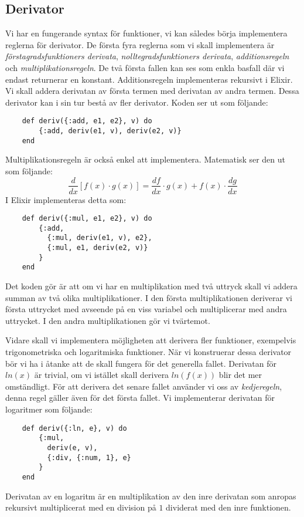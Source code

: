 \documentclass[a4paper,11pt]{article}
\begin{document}
\subsection*{Derivator}
Vi har en fungerande syntax för funktioner, vi kan således börja implementera reglerna för derivator. De första fyra reglerna som vi skall implementera är \textit{förstagradsfunktioners derivata}, \textit{nolltegradsfunktioners derivata}, \textit{additionsregeln} och \textit{multiplikationsregeln}. De två första fallen kan ses som enkla basfall där vi endast returnerar en konstant. Additionsregeln implementeras rekursivt i Elixir. Vi skall addera derivatan av första termen med derivatan av andra termen. Dessa derivator kan i sin tur bestå av fler derivator. Koden ser ut som följande:
\begin{verbatim}
    def deriv({:add, e1, e2}, v) do
        {:add, deriv(e1, v), deriv(e2, v)}
    end
\end{verbatim}
Multiplikationsregeln är också enkel att implementera. Matematisk ser den ut som följande:
$$\frac{d}{dx} [f(x) \cdot g(x)] = \frac{df}{dx} \cdot g(x) + f(x) \cdot \frac{dg}{dx}$$
I Elixir implementeras detta som:
\begin{verbatim}
    def deriv({:mul, e1, e2}, v) do
        {:add,
          {:mul, deriv(e1, v), e2},
          {:mul, e1, deriv(e2, v)}
        }
    end
\end{verbatim}
Det koden gör är att om vi har en multiplikation med två uttryck skall vi addera summan av två olika multiplikationer. I den första multiplikationen deriverar vi första uttrycket med avseende på en viss variabel och multiplicerar med andra uttrycket. I den andra multiplikationen gör vi tvärtemot. 

Vidare skall vi implementera möjligheten att derivera fler funktioner, exempelvis trigonometriska och logaritmiska funktioner. När vi konstruerar dessa derivator bör vi ha i åtanke att de skall fungera för det generella fallet. Derivatan för \(ln(x)\) är trivial, om vi istället skall derivera \(ln(f(x))\) blir det mer omständligt. För att derivera det senare fallet använder vi oss av \textit{kedjeregeln}, denna regel gäller även för det första fallet. Vi implementerar derivatan för logaritmer som följande:
\begin{verbatim}
    def deriv({:ln, e}, v) do
        {:mul,
          deriv(e, v),
          {:div, {:num, 1}, e}
        }
    end
\end{verbatim}
Derivatan av en logaritm är en multiplikation av den inre derivatan som anropas rekursivt multiplicerat med en division på \(1\) dividerat med den inre funktionen. 
\end{document}
